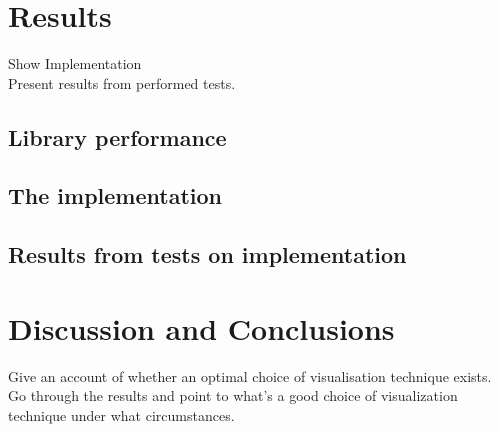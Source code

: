 \documentclass[a4paper,11pt]{kth-mag}
\begin{document}
\chapter{Results}
Show Implementation \\
Present results from performed tests.
\section{Library performance}
\section{The implementation}
\section{Results from tests on implementation}
\chapter{Discussion and Conclusions}
Give an account of whether an optimal choice of visualisation technique exists.
Go through the results and point to what's a good choice of visualization technique under what circumstances. 

\nocite{*}\\

\renewcommand{\bibname}{References}

\end{document}
